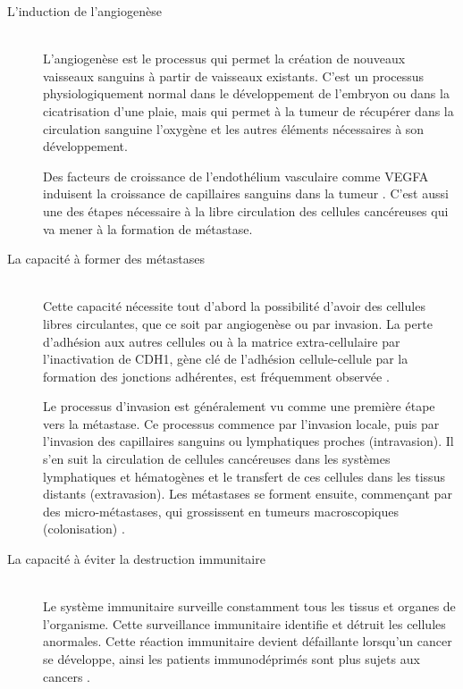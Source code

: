 \begin{description}
				\item [L'induction de l'angiogenèse]                            \hfill \\
					L'angiogenèse est le processus qui permet la création de nouveaux vaisseaux sanguins à partir de vaisseaux existants.
					C'est un processus physiologiquement normal dans le développement de l'embryon ou dans la cicatrisation d'une plaie, mais qui permet à la tumeur de récupérer dans la circulation sanguine l'oxygène et les autres éléments nécessaires à son développement.

					Des facteurs de croissance de l'endothélium vasculaire comme \acs{VEGFA} induisent la croissance de capillaires sanguins dans la tumeur \cite{Lu2012}.
					C'est aussi une des étapes nécessaire à la libre circulation des cellules cancéreuses qui va mener à la formation de métastase.

				\item [La capacité à former des métastases]                     \hfill \\
					Cette capacité nécessite tout d'abord la possibilité d'avoir des cellules libres circulantes, que ce soit par angiogenèse ou par invasion.
					La perte d'adhésion aux autres cellules ou à la matrice extra-cellulaire par l'inactivation de \acs{CDH1}, gène clé de l'adhésion cellule-cellule par la formation des jonctions adhérentes, est fréquemment observée \citep{Berx2009}.

					Le processus d'invasion est généralement vu comme une première étape vers la métastase.
					Ce processus commence par l'invasion locale, puis par l'invasion des capillaires sanguins ou lymphatiques proches (intravasion).
					Il s'en suit la circulation de cellules cancéreuses dans les systèmes lymphatiques et hématogènes et le transfert de ces cellules dans les tissus distants (extravasion).
					Les métastases se forment ensuite, commençant par des micro-métastases, qui grossissent en tumeurs macroscopiques (colonisation) \citep{Talmadge2010}.

				\item [La capacité à éviter la destruction immunitaire]         \hfill \\
					Le système immunitaire surveille constamment tous les tissus et organes de l'organisme.
					Cette surveillance immunitaire identifie et détruit les cellules anormales.
					Cette réaction immunitaire devient défaillante lorsqu'un cancer se développe, ainsi les patients immunodéprimés sont plus sujets aux cancers \citep{Vajdic2010}.


\end{description}

